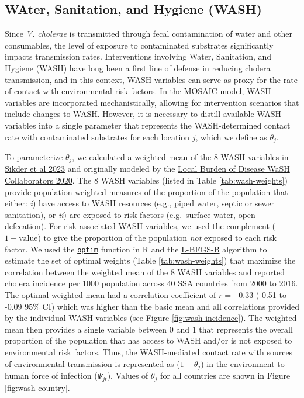 \documentclass[
]{book}
\begin{document}
\subsection{WAter, Sanitation, and Hygiene (WASH)}\label{water-sanitation-and-hygiene-wash}

Since \emph{V. cholerae} is transmitted through fecal contamination of water and other consumables, the level of exposure to contaminated substrates significantly impacts transmission rates. Interventions involving Water, Sanitation, and Hygiene (WASH) have long been a first line of defense in reducing cholera transmission, and in this context, WASH variables can serve as proxy for the rate of contact with environmental risk factors. In the MOSAIC model, WASH variables are incorporated mechanistically, allowing for intervention scenarios that include changes to WASH. However, it is necessary to distill available WASH variables into a single parameter that represents the WASH-determined contact rate with contaminated substrates for each location \(j\), which we define as \(\theta_j\).

To parameterize \(\theta_j\), we calculated a weighted mean of the 8 WASH variables in \href{https://doi.org/10.1021/acs.est.3c01317}{Sikder et al 2023} and originally modeled by the \href{https://www.thelancet.com/journals/langlo/article/PIIS2214-109X(20)30278-3/fulltext}{Local Burden of Disease WaSH Collaborators 2020}. The 8 WASH variables (listed in Table \ref{tab:wash-weights}) provide population-weighted measures of the proportion of the population that either: \emph{i}) have access to WASH resources (e.g., piped water, septic or sewer sanitation), or \emph{ii}) are exposed to risk factors (e.g.~surface water, open defecation). For risk associated WASH variables, we used the complement (\(1-\text{value}\)) to give the proportion of the population \emph{not} exposed to each risk factor. We used the \href{https://www.rdocumentation.org/packages/stats/versions/3.6.2/topics/optim}{\texttt{optim}} function in R and the \href{https://en.wikipedia.org/wiki/Limited-memory_BFGS}{L-BFGS-B} algorithm to estimate the set of optimal weights (Table \ref{tab:wash-weights}) that maximize the correlation between the weighted mean of the 8 WASH variables and reported cholera incidence per 1000 population across 40 SSA countries from 2000 to 2016. The optimal weighted mean had a correlation coefficient of \(r =\) -0.33 (-0.51 to -0.09 95\% CI) which was higher than the basic mean and all correlations provided by the individual WASH variables (see Figure \ref{fig:wash-incidence}). The weighted mean then provides a single variable between 0 and 1 that represents the overall proportion of the population that has access to WASH and/or is not exposed to environmental risk factors. Thus, the WASH-mediated contact rate with sources of environmental transmission is represented as (\(1-\theta_j\)) in the environment-to-human force of infection (\(\Psi_{jt}\)). Values of \(\theta_j\) for all countries are shown in Figure \ref{fig:wash-country}.
\end{document}
